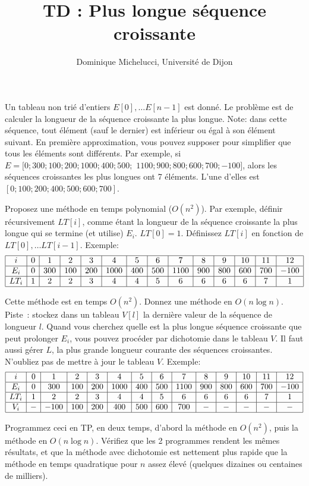 \documentclass[a4paper]{article}
\begin{document}
\title{TD : Plus longue s\'equence croissante}
\author{Dominique Michelucci, Universit\'e de Dijon}
\maketitle

Un tableau non tri\'e d'entiers $E[0], \ldots E[n-1]$  est donn\'e.
Le probl\`eme est de calculer la longueur de la s\'equence croissante la plus longue.
Note: dans cette s\'equence, tout \'el\'ement (sauf le dernier) 
est inf\'erieur ou \'egal \`a  son \'el\'ement suivant.
En premi\`ere approximation, vous pouvez supposer pour simplifier que tous les \'el\'ements sont diff\'erents.
Par exemple, si  $E=[0; 300; 100; 200; 1000; 400; 500;$ $ 1100; 900; 800; 600; 700; -100]$, alors
les s\'equences croissantes les plus longues ont 7 \'el\'ements.
L'une d'elles est $[0; 100; 200; 400; 500; 600; 700]$.

Proposez une m\'ethode en temps polynomial ($O(n^2)$). Par exemple, d\'efinir r\'ecursivement $LT[i]$, comme \'etant la longueur 
de la s\'equence croissante la plus longue qui se termine (et utilise) $E_i$. 
$LT[0]=1$. D\'efinissez $LT[i]$ en fonction de $LT[0], \ldots LT[i-1]$.
Exemple:
$$
\begin{array}{|c|c|c|c|c|c|c|c|c|c|c|c|c|c|}
\hline
i & 0 & 1 & 2 & 3 & 4 & 5 & 6 & 7 & 8 & 9 & 10 & 11 & 12  \\
\hline
E_i & 0 & 300 & 100 & 200 & 1000 & 400 & 500 & 1100 & 900 & 800 & 600 & 700 & -100 \\
\hline
LT_i & 1 & 2 & 2 & 3 & 4 & 4 & 5 & 6 & 6 & 6 & 6 &  7 & 1 \\
\hline
\end{array}
$$

Cette m\'ethode est en temps $O(n^2)$. Donnez une m\'ethode en $O(n\log n)$. Piste~: stockez dans un tableau
$V[l]$ la derni\`ere valeur de la s\'equence de longueur $l$. Quand vous cherchez quelle est la plus longue s\'equence croissante
que peut prolonger $E_i$, vous pouvez proc\'eder par dichotomie dans le tableau $V$. Il faut aussi g\'erer $L$, la plus grande 
longueur courante des s\'equences croissantes. N'oubliez pas de mettre \`a jour le tableau $V$.
Exemple: 
$$ 
\begin{array}{|c|c|c|c|c|c|c|c|c|c|c|c|c|c|}
\hline
i & 0 & 1 & 2 & 3 & 4 & 5 & 6 & 7 & 8 & 9 & 10 & 11 & 12  \\
\hline
E_i & 0 & 300 & 100 & 200 & 1000 & 400 & 500 & 1100 & 900 & 800 & 600 & 700 & -100 \\
\hline
LT_i & 1 & 2 & 2 & 3 & 4 & 4 & 5 & 6 & 6 & 6 & 6 & 7 & 1 \\
\hline
V_i & - & -100 & 100 & 200 & 400 & 500 & 600 & 700 & - & - & - & - & - \\
\hline
\end{array}
$$

Programmez ceci en TP, en deux temps, d'abord la m\'ethode en $O(n^2)$, puis la m\'ethode en $O(n\log n)$.
V\'erifiez que les 2 programmes rendent les m\^emes r\'esultats, et que la m\'ethode avec dichotomie est
nettement plus rapide que la m\'ethode en temps quadratique pour $n$ assez \'elev\'e (quelques dizaines ou centaines de milliers).
\end{document}
